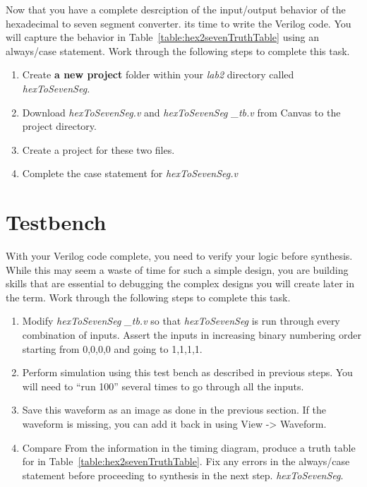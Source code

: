 Now that you have a complete desrciption of the input/output behavior
of the hexadecimal to seven segment converter. its time to write the
Verilog code.  You will capture the behavior in Table~\ref{table:hex2sevenTruthTable}
using an always/case statement.  Work through the following steps to complete this task.
\begin{enumerate}
    \item
        Create \textbf{a new project} folder within your \emph{lab2} directory
        called \emph{hexToSevenSeg.}
    \item
        Download \emph{hexToSevenSeg.v} and \emph{hexToSevenSeg \_tb.v} from
        Canvas to the project directory.
    \item
        Create a project for these two files.
    \item
        \protect\hypertarget{Hex2Seven_Verilog}{}{}Complete the case statement
        for \emph{hexToSevenSeg.v}
\end{enumerate}

\section{Testbench}
With your Verilog code complete, you need to verify your logic before
synthesis.  While this may seem a waste of time for such a simple design,
you are building skills that are essential to debugging the complex
designs you will create later in the term.  Work through the following steps
to complete this task.

\begin{enumerate}
    \item
        Modify \emph{hexToSevenSeg \_tb.v} so that \emph{hexToSevenSeg} is run
        through every combination of inputs. Assert the inputs in increasing
        binary numbering order starting from 0,0,0,0 and going to 1,1,1,1.
    \item
        Perform simulation using this test bench as described in previous
        steps. You will need to ``run 100'' several times to go through all
        the inputs.
    \item
        \protect\hypertarget{Hex2Seven_Waveform}{}{}Save this waveform as an
        image as done in the previous section. If the waveform is missing, you
        can add it back in using View -\textgreater{} Waveform.
    \item
        Compare From the information in the timing diagram, produce a truth table for
        in Table~\ref{table:hex2sevenTruthTable}.  Fix any errors in the always/case statement
        before proceeding to synthesis in the next step.
        \emph{hexToSevenSeg}.
\end{enumerate}

